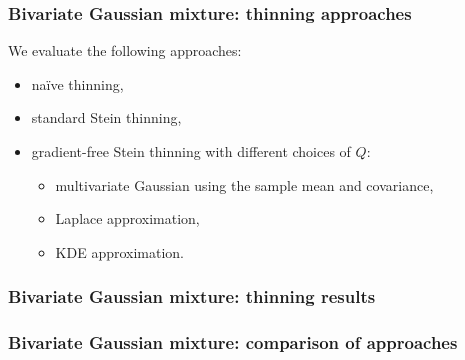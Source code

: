 \documentclass{beamer}
\begin{document}
\begin{frame}
\frametitle{Bivariate Gaussian mixture: thinning approaches}

We evaluate the following approaches:
\begin{itemize}
\item na\"ive thinning,
\item standard Stein thinning,
\item gradient-free Stein thinning with different choices of $Q$:
	\begin{itemize}
	\item multivariate Gaussian using the sample mean and covariance,
	\item Laplace approximation,
	\item KDE approximation.
	\end{itemize}
\end{itemize}

\end{frame}

\begin{frame}
\frametitle{Bivariate Gaussian mixture: thinning results}

\begin{figure}[H]
\centering
{}
\end{figure}

\end{frame}

\begin{frame}
\frametitle{Bivariate Gaussian mixture: comparison of approaches}

\begin{figure}[h]
\centering
{}
\end{figure}

\end{frame}
\end{document}
